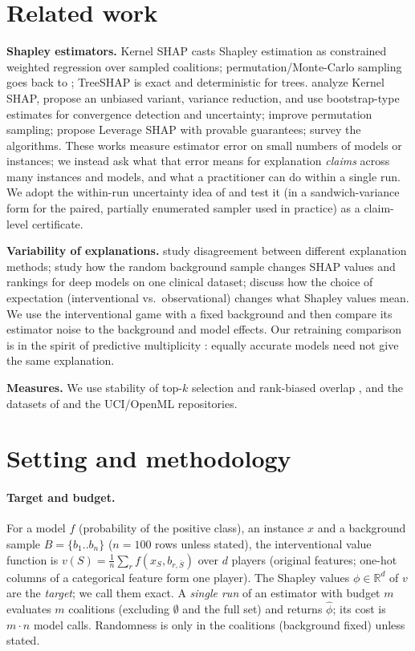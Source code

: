 \documentclass{article}
\newcommand{\phat}{\hat\phi}
\begin{document}
\section{Related work}
\textbf{Shapley estimators.} Kernel SHAP \citep{lundberg2017} casts Shapley estimation as constrained weighted regression over sampled coalitions; permutation/Monte-Carlo sampling goes back to \citet{strumbelj2014}; TreeSHAP \citep{lundberg2020} is exact and deterministic for trees. \citet{covert2021} analyze Kernel SHAP, propose an unbiased variant, variance reduction, and use bootstrap-type estimates for convergence detection and uncertainty; \citet{mitchell2022} improve permutation sampling; \citet{musco2024} propose Leverage SHAP with provable guarantees; \citet{chen2023} survey the algorithms. These works measure estimator error on small numbers of models or instances; we instead ask what that error means for explanation \emph{claims} across many instances and models, and what a practitioner can do within a single run. We adopt the within-run uncertainty idea of \citet{covert2021} and test it (in a sandwich-variance form for the paired, partially enumerated sampler used in practice) as a claim-level certificate.

\textbf{Variability of explanations.} \citet{krishna2022} study disagreement between different explanation methods; \citet{yuan2022} study how the random background sample changes SHAP values and rankings for deep models on one clinical dataset; \citet{chen2020} discuss how the choice of expectation (interventional vs.\ observational) changes what Shapley values mean. We use the interventional game with a fixed background and then compare its estimator noise to the background and model effects. Our retraining comparison is in the spirit of predictive multiplicity \citep{marx2019}: equally accurate models need not give the same explanation.

\textbf{Measures.} We use stability of top-$k$ selection \citep{nogueira2018} and rank-biased overlap \citep{webber2010}, and the datasets of \citet{ding2021} and the UCI/OpenML repositories.

\section{Setting and methodology}\label{sec:method}
\paragraph{Target and budget.} For a model $f$ (probability of the positive class), an instance $x$ and a background sample $B=\{b_1..b_n\}$ ($n{=}100$ rows unless stated), the interventional value function is $v(S)=\frac1n\sum_r f(x_S,b_{r,\bar S})$ over $d$ players (original features; one-hot columns of a categorical feature form one player). The Shapley values $\phi\in\mathbb{R}^d$ of $v$ are the \emph{target}; we call them exact. A \emph{single run} of an estimator with budget $m$ evaluates $m$ coalitions (excluding $\emptyset$ and the full set) and returns $\phat$; its cost is $m\cdot n$ model calls. Randomness is only in the coalitions (background fixed) unless stated.
\end{document}
